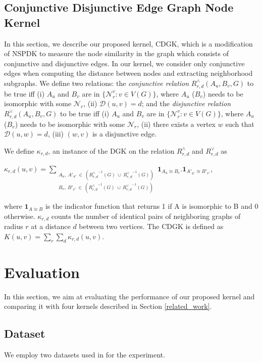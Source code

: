 \documentclass{esannV2}
\begin{document}
\subsection{Conjunctive Disjunctive Edge Graph Node Kernel}
In this section, we describe our proposed kernel, CDGK, which is a modification of NSPDK to measure the node similarity in the graph which consists of conjunctive and disjunctive edges. In our kernel, we consider only conjunctive edges when computing the distance between nodes and extracting neighborhood subgraphs. We define two relations: the \textit{conjunctive relation} $R^{\wedge}_{r,d}(A_u, B_v, G)$ to be true iff (i) $A_u$ and $B_v$ are in $\lbrace \mathcal{N}_r^v: v \in V(G) \rbrace$, where $A_u$ ($B_v$) needs to be isomorphic with some $\mathcal{N}_r$, (ii) $\mathcal{D}(u,v)= d$; and the \textit{disjunctive relation} $R_{r,d}^{\vee}(A_u, B_v, G)$ to be true iff (i) $A_u$ and $B_v$ are in $\lbrace \mathcal{N}_r^v: v \in V(G) \rbrace$, where $A_u$ ($B_v$) needs to be isomorphic with some $\mathcal{N}_r$,  (ii) there exists a vertex $w$ such that $\mathcal{D}(u,w)= d$, (iii) $(w,v)$ is a disjunctive edge.

We define $\kappa_{r,d}$, an instance of the DGK on the relation $R^{\wedge}_{r,d}$ and $R^{\vee}_{r,d}$ as
\begin{center}
 $\kappa_{r,d}(u,v) = \sum\limits_{\substack
 {A_u,\ {A'}_{u'} \ \in \ ({R_{r,d}^{\wedge}}^{ -1}(G)\ \cup\  {R_{r,d}^{\vee}}^{ -1}(G)) \\
  B_v,\ {B'}_{v'} \ \in \ ({R_{r,d}^{\wedge}}^{ -1}(G)\ \cup\  {R_{r,d}^{\vee}}^{ -1}(G)) }}
  { \textbf{1}_{A_u \cong B_v}.{ \textbf{1}_{A'_{u'} \cong B'_{v'}}}}$,
\end{center}
where $\textbf{1}_{A \cong B}$ is the indicator function that returns 1 if A is isomorphic to B and 0 otherwise.
$\kappa_{r,d}$ counts the number of identical pairs of neighboring graphs of radius $r$ at a distance $d$ between two vertices. The CDGK is defined as $K(u,v) = \sum\limits_{r}{\sum\limits_{d}{\kappa_{r,d}(u,v)}}$.
\section{Evaluation}
\label{evaluation}
In this section, we aim at evaluating the performance of our proposed kernel and comparing it with four kernels described in Section \ref{related_work}.
\subsection{Dataset}
We employ two datasets used in \cite{medk} for the experiment.
\end{document}
